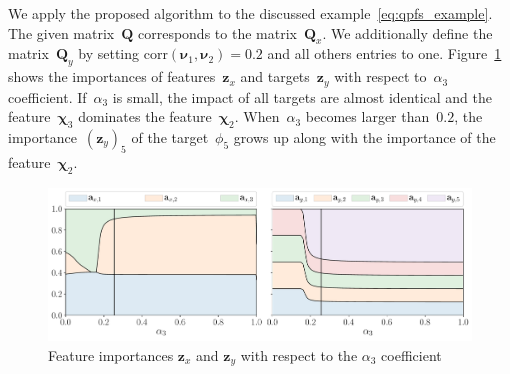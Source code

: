\documentclass[12pt,oneside]{article}
\theoremstyle{definition}
\newcommand{\bz}{\mathbf{z}}
\newcommand{\bQ}{\mathbf{Q}}
\newcommand{\bchi}{\boldsymbol{\chi}}
\newcommand{\bnu}{\boldsymbol{\nu}}
\begin{document}
We apply the proposed algorithm to the discussed example~\eqref{eq:qpfs_example}.
The given matrix~$\bQ$ corresponds to the matrix~$\bQ_x$.
We additionally define the matrix~$\bQ_y$ by setting $\text{corr}(\bnu_1, \bnu_2) = 0.2$ and all others entries to one.
Figure~\ref{fig:features_vs_alpha} shows the importances of features~$\bz_x$ and targets~$\bz_y$ with respect to~$\alpha_3$ coefficient.
If~$\alpha_3$ is small, the impact of all targets are almost identical and the feature~$\bchi_3$ dominates the feature~$\bchi_2$. When~$\alpha_3$ becomes larger than~$0.2$, the importance~$(\bz_y)_5$ of the target~$\phi_5$ grows up along with the importance of the feature~$\bchi_2$.

\begin{figure}
	\centering
	\includegraphics[width=\linewidth]{figs/features_vs_alpha.pdf}
	\caption{Feature importances $\bz_x$ and $\bz_y$ with respect to the $\alpha_3$ coefficient}
	\label{fig:features_vs_alpha}
\end{figure}
\end{document}
